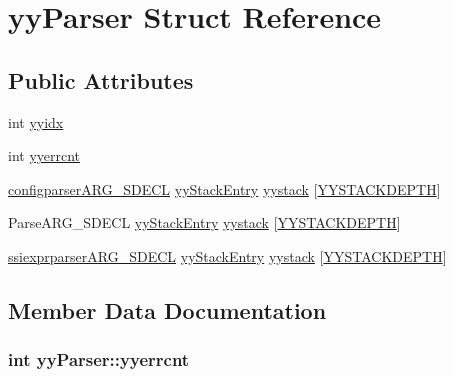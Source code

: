 \hypertarget{structyyParser}{\section{yy\-Parser Struct Reference}
\label{structyyParser}
}
\subsection*{Public Attributes}
\begin{DoxyCompactItemize}
\item 
int \hyperlink{structyyParser_a19abcf4780515fd2debd1ce7a2e29f95}{yyidx}
\item 
int \hyperlink{structyyParser_ac0350933aa515a3a756dfa742d04ee59}{yyerrcnt}
\item 
\hyperlink{configparser_8c_a9813772ab9fd0fb19ccb6aa2eb43ffff}{configparser\-A\-R\-G\-\_\-\-S\-D\-E\-C\-L} \hyperlink{structyyStackEntry}{yy\-Stack\-Entry} \hyperlink{structyyParser_a0234b21d500d6b491707c741a1712575}{yystack} \mbox{[}\hyperlink{mod__ssi__exprparser_8c_ad059052e5b8828cc7d19b4c8494ecb07}{Y\-Y\-S\-T\-A\-C\-K\-D\-E\-P\-T\-H}\mbox{]}
\item 
Parse\-A\-R\-G\-\_\-\-S\-D\-E\-C\-L \hyperlink{structyyStackEntry}{yy\-Stack\-Entry} \hyperlink{structyyParser_a269e4ebdc22c0b9102a8e29eebbdc201}{yystack} \mbox{[}\hyperlink{mod__ssi__exprparser_8c_ad059052e5b8828cc7d19b4c8494ecb07}{Y\-Y\-S\-T\-A\-C\-K\-D\-E\-P\-T\-H}\mbox{]}
\item 
\hyperlink{mod__ssi__exprparser_8c_a504ef14dea62eddd03706766d89368be}{ssiexprparser\-A\-R\-G\-\_\-\-S\-D\-E\-C\-L} \hyperlink{structyyStackEntry}{yy\-Stack\-Entry} \hyperlink{structyyParser_a7a3b236df0640420355349cc7925305e}{yystack} \mbox{[}\hyperlink{mod__ssi__exprparser_8c_ad059052e5b8828cc7d19b4c8494ecb07}{Y\-Y\-S\-T\-A\-C\-K\-D\-E\-P\-T\-H}\mbox{]}
\end{DoxyCompactItemize}


\subsection{Member Data Documentation}
\hypertarget{structyyParser_ac0350933aa515a3a756dfa742d04ee59}{
\subsubsection[{yyerrcnt}]{\setlength{\rightskip}{0pt plus 5cm}int yy\-Parser\-::yyerrcnt}}\label{structyyParser_ac0350933aa515a3a756dfa742d04ee59}



